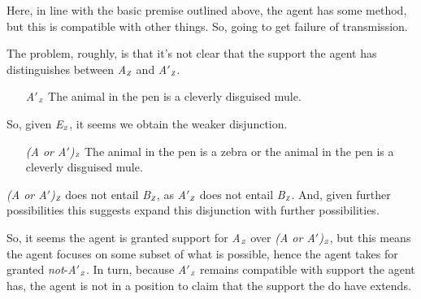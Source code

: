 \documentclass[10pt]{article}
\newcommand{\tri}[2]{\emph{#2}\(_{\text{\tiny\emph #1}}\)}
\begin{document}
\begin{note}
  Here, in line with the basic premise outlined above, the agent has some method, but this is compatible with other things.
  So, going to get failure of transmission.

    The problem, roughly, is that it's not clear that the support the agent has distinguishes between \tri{Z}{A} and \tri{Z}{A\('\)}.
  \begin{enumerate}
  \item[\tri{Z}{A\('\)}] The animal in the pen is a cleverly disguised mule.
  \end{enumerate}
  So, given \tri{Z}{E}, it seems we obtain the weaker disjunction.
  \begin{enumerate}
  \item[\tri{Z}{(A or A\('\))}] The animal in the pen is a zebra or the animal in the pen is a cleverly disguised mule.
  \end{enumerate}
  \tri{Z}{(A or A\('\))} does not entail \tri{Z}{B}, as \tri{Z}{A\('\)} does not entail \tri{Z}{B}.
  And, given further possibilities this suggests expand this disjunction with further possibilities.

  So, it seems the agent is granted support for \tri{Z}{A} over \tri{Z}{(A or A\('\))}, but this means the agent focuses on some subset of what is possible, hence the agent takes for granted \emph{not}-\tri{Z}{A\('\)}.
  In turn, because \tri{Z}{A\('\)} remains compatible with support the agent has, the agent is not in a position to claim that the support the do have extends.
\end{note}
\end{document}

